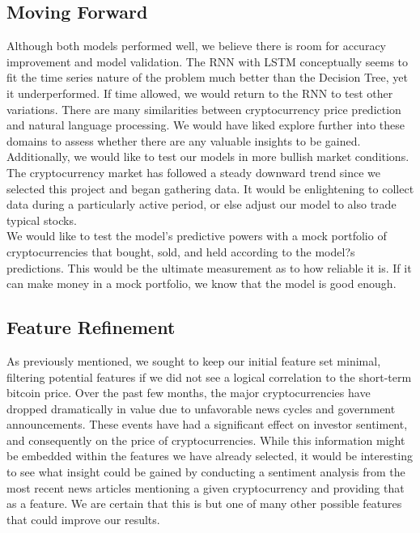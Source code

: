 \documentclass{article}
\begin{document}
\subsection{ Moving Forward }
Although both models performed well, we believe there is room for accuracy improvement and model validation. The RNN with LSTM conceptually seems to fit the time series nature of the problem much better than the Decision Tree, yet it underperformed. If time allowed, we would return to the RNN to test other variations. There are many similarities between cryptocurrency price prediction and natural language processing. We would have liked explore further into these domains to assess whether there are any valuable insights to be gained. \\

Additionally, we would like to test our models in more bullish market conditions. The cryptocurrency market has followed a steady downward trend since we selected this project and began gathering data. It would be enlightening to collect data during a particularly active period, or else adjust our model to also trade typical stocks. \\

We would like to test the model's predictive powers with a mock portfolio of cryptocurrencies that bought, sold, and held according to the model?s predictions. This would be the ultimate measurement as to how reliable it is. If it can make money in a mock portfolio, we know that the model is good enough. \\

\subsection{ Feature Refinement }
As previously mentioned, we sought to keep our initial feature set minimal, filtering potential features if we did not see a logical correlation to the short-term bitcoin price. Over the past few months, the major cryptocurrencies have dropped dramatically in value due to unfavorable news cycles and government announcements. These events have had a significant effect on investor sentiment, and consequently on the price of cryptocurrencies. While this information might be embedded within the features we have already selected, it would be interesting to see what insight could be gained by conducting a sentiment analysis from the most recent news articles mentioning a given cryptocurrency and providing that as a feature. We are certain that this is but one of many other possible features that could improve our results.
\end{document}
